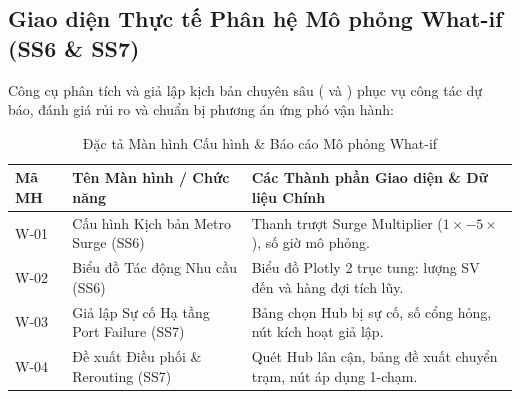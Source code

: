 \documentclass[12pt,a4paper]{article}
\begin{document}
\clearpage
\subsection{Giao diện Thực tế Phân hệ Mô phỏng What-if (SS6 \& SS7)}
Công cụ phân tích và giả lập kịch bản chuyên sâu ( và ) phục vụ công tác dự báo, đánh giá rủi ro và chuẩn bị phương án ứng phó vận hành:

\begin{table}[H]
    \centering
    \small
    \renewcommand{\arraystretch}{1.2}
    \caption{Đặc tả Màn hình Cấu hình \& Báo cáo Mô phỏng What-if}
    \label{tab:ui-whatif-screens}
    \begin{tabularx}{\textwidth}{|l|l|X|}
        \hline
        \textbf{Mã MH} & \textbf{Tên Màn hình / Chức năng} & \textbf{Các Thành phần Giao diện \& Dữ liệu Chính} \\
        \hline
        W-01 & Cấu hình Kịch bản Metro Surge (SS6) & Thanh trượt Surge Multiplier ($1\times - 5\times$), số giờ mô phỏng. \\
        \hline
        W-02 & Biểu đồ Tác động Nhu cầu (SS6) & Biểu đồ Plotly 2 trục tung: lượng SV đến và hàng đợi tích lũy. \\
        \hline
        W-03 & Giả lập Sự cố Hạ tầng Port Failure (SS7) & Bảng chọn Hub bị sự cố, số cổng hỏng, nút kích hoạt giả lập. \\
        \hline
        W-04 & Đề xuất Điều phối \& Rerouting (SS7) & Quét Hub lân cận, bảng đề xuất chuyển trạm, nút áp dụng 1-chạm. \\
        \hline
    \end{tabularx}
\end{table}

\clearpage
\end{document}
